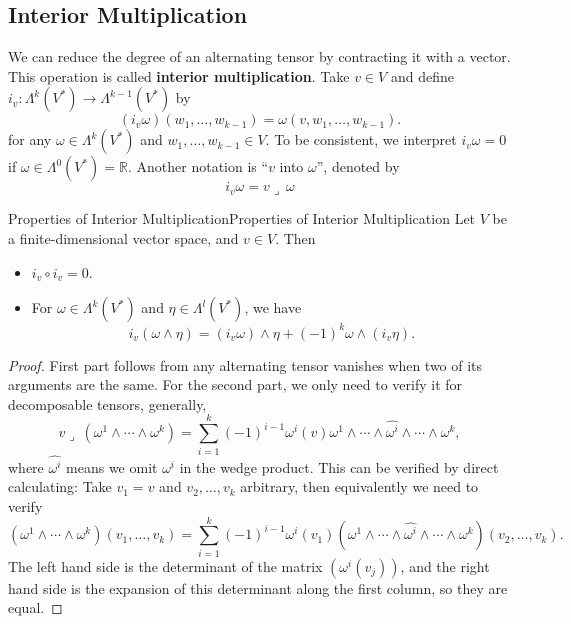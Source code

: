 \documentclass[../main.tex]{subfiles}
\begin{document}
\subsection{Interior Multiplication}
We can reduce the degree of an alternating tensor by contracting it with a vector. This operation is called \textbf{interior multiplication}. Take $v\in V$ and define $i_v : \Lambda^k(V^*) \to \Lambda^{k-1}(V^*)$ by
\begin{equation}
  (i_v \omega)(w_1, \dots, w_{k-1}) = \omega(v, w_1, \dots, w_{k-1}).
\end{equation}
for any $\omega \in \Lambda^k(V^*)$ and $w_1, \dots, w_{k-1} \in V$. To be consistent, we interpret $i_v \omega = 0$ if $\omega \in \Lambda^0(V^*) = \mathbb{R}$. Another notation is ``$v$ into $\omega$'', denoted by
\begin{equation}
  i_v \omega = v \lrcorner \ \omega
\end{equation}

\begin{proposition}{Properties of Interior Multiplication}{Properties of Interior Multiplication}
  Let $V$ be a finite-dimensional vector space, and $v \in V$. Then 
  \begin{itemize}
    \item $i_v \circ i_v = 0$.
    \item For $\omega \in \Lambda^k(V^*)$ and $\eta \in \Lambda^l(V^*)$, we have
      \begin{equation*}
        i_v(\omega \wedge \eta) = (i_v \omega) \wedge \eta + (-1)^k \omega \wedge (i_v \eta).
      \end{equation*}
  \end{itemize}
\end{proposition}
\begin{proof}
  First part follows from any alternating tensor vanishes when two of its arguments are the same. For the second part, we only need to verify it for decomposable tensors, generally,
  \begin{equation*}
    v \lrcorner \ (\omega^1 \wedge \cdots \wedge \omega^{k}) = \sum_{i=1}^k (-1)^{i-1} \omega^i(v) \omega^1 \wedge \cdots \wedge \widehat{\omega^i} \wedge \cdots \wedge \omega^k,
  \end{equation*}
  where $\widehat{\omega^i}$ means we omit $\omega^i$ in the wedge product. This can be verified by direct calculating: Take $v_1=v$ and $v_2, \dots, v_k$ arbitrary, then equivalently we need to verify
  \begin{equation*}
    (\omega^1 \wedge \cdots \wedge \omega^{k})(v_1, \dots, v_k) = \sum_{i=1}^k (-1)^{i-1} \omega^i(v_1) (\omega^1 \wedge \cdots \wedge \widehat{\omega^i} \wedge \cdots \wedge \omega^k)(v_2, \dots, v_k).
  \end{equation*}
  The left hand side is the determinant of the matrix $(\omega^i(v_j))$, and the right hand side is the expansion of this determinant along the first column, so they are equal.
\end{proof}
\end{document}
